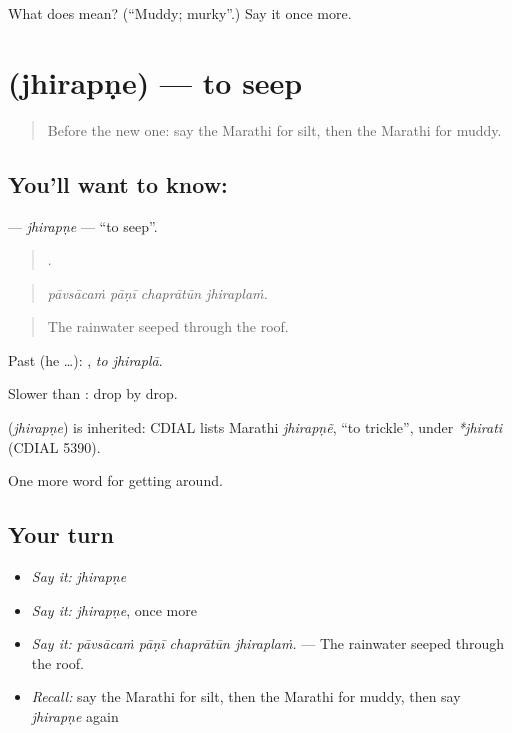 \begin{tcolorbox}[breakable,colback=teal!4,colframe=teal!35!black,title={Before you move on}]
What does  mean? (\textquotedblleft{}Muddy; murky\textquotedblright{}.) Say it once more.
\end{tcolorbox}
\section[\texorpdfstring{\mr{झिरपणे} (jhirapṇe)}{झिरपणे (jhirapṇe)}]{ (jhirapṇe) — to seep}

\label{lesson:MR-C444-jhirapne}



\begin{quote}
Before the new one: say the Marathi for silt, then the Marathi for muddy.
\end{quote}

\subsection*{You'll want to know: }
\textbf{} — \emph{jhirapṇe} — \textquotedblleft{}to seep\textquotedblright{}.

\begin{quote}
   .
\end{quote}

\begin{quote}
\emph{pāvsācaṁ pāṇī chaprātūn jhiraplaṁ.}
\end{quote}

\begin{quote}
The rainwater seeped through the roof.
\end{quote}

Past (he …):  , \emph{to jhiraplā}.

Slower than : drop by drop.

\begin{cousinweb}
\textbf{} (\emph{jhirapṇe}) is inherited: CDIAL lists Marathi \emph{jhirapṇẽ}, \textquotedblleft{}to trickle\textquotedblright{}, under \emph{*jhirati} (CDIAL 5390).
\end{cousinweb}

\begin{grammarlens}[title={What you've built}]
One more word for getting around.
\end{grammarlens}

\subsection*{Your turn}
\begin{itemize}
\raggedright
  \item \emph{Say it:} \emph{jhirapṇe}
  \item \emph{Say it:} \emph{jhirapṇe}, once more
  \item \emph{Say it:} \emph{pāvsācaṁ pāṇī chaprātūn jhiraplaṁ.} — The rainwater seeped through the roof.
  \item \emph{Recall:} say the Marathi for silt, then the Marathi for muddy, then say \emph{jhirapṇe} again
\end{itemize}

